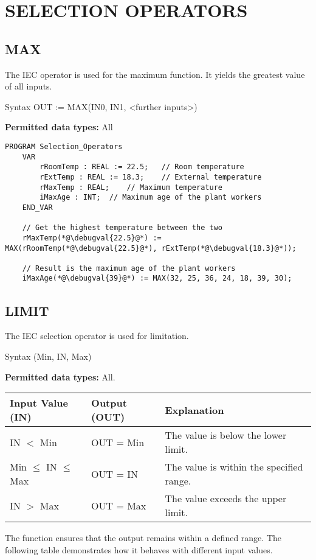 \section{SELECTION OPERATORS}


\subsection{MAX}

The IEC operator is used for the maximum function. It yields the greatest value of all inputs.

\begin{Box1}{Syntax}
	OUT := MAX(IN0, IN1, <further inputs>)
\end{Box1}	

\textbf{Permitted data types:} All


\begin{lstlisting}[language=ST ]
	PROGRAM Selection_Operators
	VAR
		rRoomTemp : REAL := 22.5;   // Room temperature
		rExtTemp : REAL := 18.3;    // External temperature
		rMaxTemp : REAL;    // Maximum temperature
		iMaxAge : INT;  // Maximum age of the plant workers
	END_VAR
	
	// Get the highest temperature between the two
	rMaxTemp(*@\debugval{22.5}@*) := MAX(rRoomTemp(*@\debugval{22.5}@*), rExtTemp(*@\debugval{18.3}@*));
	
	// Result is the maximum age of the plant workers
	iMaxAge(*@\debugval{39}@*) := MAX(32, 25, 36, 24, 18, 39, 30);  
\end{lstlisting}




\subsection{LIMIT}
The IEC selection operator is used for limitation.

\begin{Box1}{Syntax}
	(Min, IN, Max) \hspace{5pt}
\end{Box1}	
\textbf{Permitted data types:} All.

\begin{tabular}{lll} %
	\hline
	\textbf{Input Value (IN)} & \textbf{Output (OUT)} & \textbf{Explanation} \\
	\hline
	IN $<$ Min & OUT = Min & The value is below the lower limit. \\ 
	\hline
	Min $\leq$ IN $\leq$ Max & OUT = IN & The value is within the specified range. \\ 
	\hline
	IN $>$ Max & OUT = Max & The value exceeds the upper limit. \\ 
	\hline
\end{tabular}
\newpage
The  function ensures that the output remains within a defined range. The following table demonstrates how it behaves with different input values.

